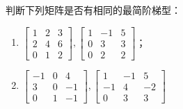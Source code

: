 \begin{problem}\label{problem-1.33}
判断下列矩阵是否有相同的最简阶梯型：
\begin{enumerate}
    \item \(\begin{bmatrix}1&2&3\\2&4&6\\0&1&2\end{bmatrix},\begin{bmatrix}1&-1&5\\0&3&3\\0&2&2\end{bmatrix}\)；
    \item \(\begin{bmatrix}-1&0&4\\3&0&-1\\0&1&-1\end{bmatrix},\begin{bmatrix}1&-1&5\\-1&4&-2\\0&3&3\end{bmatrix}\)
\end{enumerate}
\end{problem}
